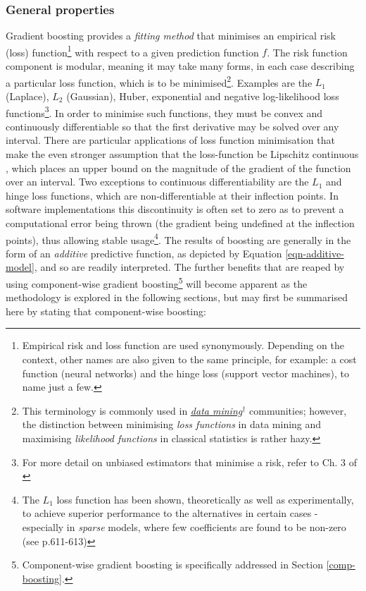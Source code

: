 \documentclass{article}
\begin{document}
\subsubsection{General properties \label{gen-props}}
\label{sec-5-3-2}

Gradient boosting provides a \emph{fitting method} that minimises an empirical risk (loss) function\footnote{Empirical risk and loss function are used synonymously. Depending on the context, other names are also given to the same principle, for example: a cost function (neural networks) and the hinge loss (support vector machines), to name just a few.} with respect to a given prediction function $f$. The risk function component is modular, meaning it may take many forms, in each case describing a particular loss function, which is to be minimised\footnote{This terminology is commonly used in \href{https://en.wikipedia.org/wiki/Data_mining}{\emph{data mining$^{\dag{}}$}} communities; however, the distinction between minimising \emph{loss functions} in data mining and maximising \emph{likelihood functions} in classical statistics is rather hazy.}. Examples are the $L_1$ (Laplace), $L_2$ (Gaussian), Huber, exponential and negative log-likelihood loss functions\footnote{For more detail on unbiased estimators that minimise a risk, refer to Ch. 3 of \cite{pfanzagl1994parametric}}. In order to minimise such functions, they must be convex and continuously differentiable so that the first derivative may be solved over any interval. There are particular applications of loss function minimisation that make the even stronger assumption that the loss-function be Lipschitz continuous \cite{dimitrakakis2013differential}, which places an upper bound on the magnitude of the gradient of the function over an interval. Two exceptions to continuous differentiability are the $L_1$ and hinge loss functions, which are non-differentiable at their inflection points. In software implementations this discontinuity is often set to zero as to prevent a computational error being thrown (the gradient being undefined at the inflection points), thus allowing stable usage\footnote{The $L_1$ loss function has been shown, theoretically as well as experimentally, to achieve superior performance to the alternatives in certain cases - especially in \emph{sparse} models, where few coefficients are found to be non-zero (see \cite{Hastie2009} p.611-613)}.
The results of boosting are generally in the form of an \emph{additive} predictive function, as depicted by Equation \eqref{eqn-additive-model}, and so are readily interpreted. The further benefits that are reaped by using component-wise gradient boosting\footnote{Component-wise gradient boosting is specifically addressed in Section \ref{comp-boosting}.} will become apparent as the methodology is explored in the following sections, but may first be summarised here by stating that component-wise boosting:
\end{document}
